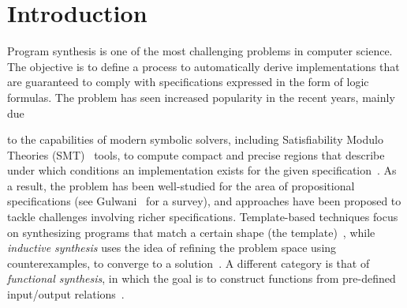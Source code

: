 
\section{Introduction}

Program synthesis is one of the most challenging problems in computer science. The objective is to define a process to automatically derive implementations that are guaranteed to comply with specifications expressed in the form of logic formulas. The problem has seen increased popularity in the recent years, mainly due
\iffalse
 Program synthesis owes its origins to Church~\cite{church1962logic} (otherwise known as Church's Problem), and has long been an important area of research.
%
%
After the seminal paper by Pnueli and Rosner~\cite{pnueli1989synthesis} on reactive synthesis, the problem has seen increased popularity
\grigory{Actually, the synthesis got popular after the death of Pnueli. Pnueli himself was very skeptical about this idea.}
\fi
to the capabilities of modern symbolic solvers, including Satisfiability Modulo Theories (SMT)~\cite{BarFT-SMTLIB} tools, to compute compact and precise regions that describe under which conditions an implementation exists for the given specification~\cite{reynolds2015counterexample}.
 As a result, the problem has been well-studied for the area of propositional specifications (see Gulwani~\cite{gulwani2010dimensions} for a survey), and approaches have been proposed to tackle challenges involving richer specifications. Template-based techniques focus on synthesizing programs that
match a certain shape (the template)~\cite{srivastava2013template}, while {\em inductive synthesis} uses the idea of refining the problem space using counterexamples, to converge to a solution~\cite{flener2001inductive}.
A different category is that of \textit{functional synthesis}, in which the goal is to construct functions from pre-defined input/output relations~\cite{kuncak2013functional}.

